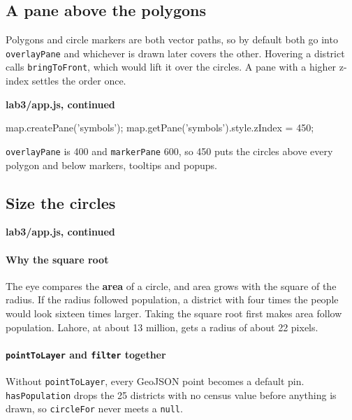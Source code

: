 \documentclass{article}
\newcommand{\cd}[1]{\texttt{#1}}
\newcommand{\codecap}[1]{%
  \par\vspace{.9em}\noindent\textbf{#1}\par\vspace{-.6em}}
\begin{document}
\subsection{A pane above the polygons}

Polygons and circle markers are both vector paths, so by default both go
into \cd{overlayPane} and whichever is drawn later covers the other.
Hovering a district calls \cd{bringToFront}, which would lift it over
the circles. A pane with a higher z-index settles the order once.

\codecap{lab3/app.js, continued}
\begin{code}
map.createPane('symbols');
map.getPane('symbols').style.zIndex = 450;
\end{code}

\cd{overlayPane} is 400 and \cd{markerPane} 600, so 450 puts the circles
above every polygon and below markers, tooltips and popups.

\subsection{Size the circles}

\codecap{lab3/app.js, continued}

\paragraph{Why the square root}
The eye compares the \textbf{area} of a circle, and area grows with the
square of the radius. If the radius followed population, a district with
four times the people would look sixteen times larger. Taking the square
root first makes area follow population. Lahore, at about 13 million,
gets a radius of about 22 pixels.

\paragraph{\texttt{pointToLayer} and \texttt{filter} together}
Without \cd{pointToLayer}, every GeoJSON point becomes a default pin.
\cd{hasPopulation} drops the 25 districts with no census value before
anything is drawn, so \cd{circleFor} never meets a \cd{null}.
\end{document}
